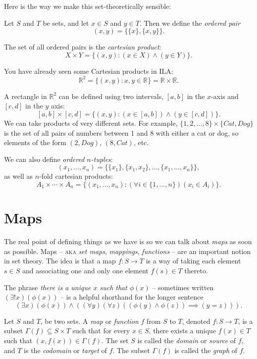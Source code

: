 \documentclass[11pt,dvipsnames]{book}
\def\R{\mathbb{R}}
\numberwithin{equation}{section} %
\numberwithin{figure}{section} %
\numberwithin{table}{section} %
\begin{document}
Here is the way we make this set-theoretically sensible:
\begin{definition}
Let $S$ and $T$ be sets, and let $x \in S$ and $y \in T$.
Then we define the \emph{ordered pair}
\[
(x,y) = \{\{x\},\{x,y\}\}.
\]

The set of all ordered pairs is the \emph{cartesian product}:
\[
X \times Y = \{(x,y) : (x \in X)\wedge (y \in Y)\}.
\]
\end{definition}

You have already seen some Cartesian products in ILA: 
\[
\R^{2} = \{(x,y) : x,y\in\mathbb{R}\} = \mathbb{R}\times \mathbb{R}.
\]

A rectangle in $\mathbb{R}^{2}$ can be defined using two intervals, $[a,b]$ in the $x$-axis and $[c,d]$ in the $y$ axis:
\[
[a,b]\times [c,d]=\{(x,y) : (x\in [a,b]) \wedge (y\in [c,d])\}.
\]
We can take products of very different sets. For example, $\{1,2,...,8\}\times \{Cat,Dog\}$ is the set of all pairs of numbers between 1 and 8 with either a cat or dog, so elements of the form $(2,Dog)$, $(8,Cat)$, etc.

We can also define \emph{ordered $n$-tuples}:
\[
(x_1, \dots, x_n) = \{\{x_1\}, \{x_1,x_2\}, \dots, \{x_1, \dots, x_n\}\},
\]
as well as $n$-fold cartesian products:
\[
A_1 \times \cdots \times A_n =\{(x_1, \dots, x_n) : (\forall i \in \{1,\dots,n\})(x_i \in A_i)\}.
\]

\section{Maps}

The real point of defining things as we have is so we can talk about \emph{maps} as soon as possible.
Maps -- \textsc{aka} \emph{set maps}, \emph{mappings}, \emph{functions} -- are an important notion in set theory.
The idea is that a map $f\colon S \to T$ is a way of taking each element $s\in S$ and associating one and only one element $f(s)\in T$ thereto.

The phrase \emph{there is a unique $x$ such that $\phi(x)$} -- sometimes written $(\exists ! x)(\phi(x))$ -- is a helpful shorthand for the longer sentence
\[
	(\exists x)(\phi(x)) \wedge ((\forall y)(\forall z)((\phi(y)\wedge \phi(z))\implies(y=z))).
\]

\begin{definition}
Let $S$ and $T$, be two sets.
A \emph{map} or \emph{function} $f$ from $S$ to $T$, denoted $f\colon S\to T$, is a subset $\Gamma(f) \subseteq S \times T$ such that for every $x \in S$, there exists a unique $f(x) \in T$ such that $(x,f(x)) \in \Gamma(f)$.
The set $S$ is called the {\it domain} or \emph{source} of $f$, and $T$ is the {\it codomain} or \emph{target} of $f$. The subset $\Gamma(f)$ is called the \emph{graph} of $f$.
\end{definition}
\end{document}

